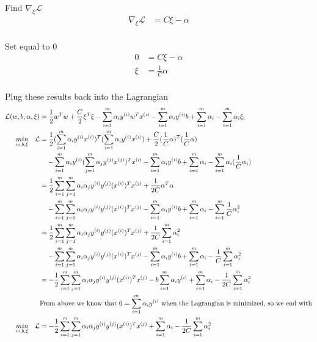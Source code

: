 \documentclass[11pt]{article}
\begin{document}
Find $\nabla_{\xi} \mathcal{L}$
\begin{align*}
  \nabla_{\xi} \mathcal{L} &= C \xi - \alpha \\
\end{align*}

Set equal to 0
\begin{align*}
  0   &= C \xi - \alpha \\
  \xi &= \frac{1}{C} \alpha \\
\end{align*}

Plug these results back into the Lagrangian
\begin{align*}
  \mathcal{L}(w,b,\alpha,\xi) &= \frac{1}{2} w^T w + \frac{C}{2} \xi^T \xi - \sum_{i=1}^{m} \alpha_i y^{(i)} w^T x^{(i)} - \sum_{i=1}^{m} \alpha_i y^{(i)} b + \sum_{i=1}^{m} \alpha_i - \sum_{i=1}^{m} \alpha_i \xi_i \\
  \underset{w,b,\xi}{min} \quad \mathcal{L} &= \frac{1}{2} (\sum_{i=1}^{m} \alpha_i y^{(i)} x^{(i)})^T (\sum_{i=1}^{m} \alpha_i y^{(i)} x^{(i)}) + \frac{C}{2} (\frac{1}{C} \alpha)^T (\frac{1}{C} \alpha) \\
                                            &\quad - \sum_{i=1}^{m} \alpha_i y^{(i)} (\sum_{j=1}^{m} \alpha_j y^{(j)} x^{(j)})^T x^{(i)} - \sum_{i=1}^{m} \alpha_i y^{(i)} b + \sum_{i=1}^{m} \alpha_i - \sum_{i=1}^{m} \alpha_i (\frac{1}{C} \alpha_i) \\
                                            &= \frac{1}{2} \sum_{i=1}^{m} \sum_{j=1}^{m} \alpha_i \alpha_j y^{(i)} y^{(j)} (x^{(i)})^T x^{(j)} + \frac{1}{2C} \alpha^T \alpha \\
                                            &\quad - \sum_{i=1}^{m} \sum_{j=1}^{m} \alpha_i \alpha_j y^{(i)} y^{(j)} (x^{(i)})^T x^{(j)} - \sum_{i=1}^{m} \alpha_i y^{(i)} b + \sum_{i=1}^{m} \alpha_i - \sum_{i=1}^{m} \frac{1}{C} \alpha_i^2 \\ 
                                            &= \frac{1}{2} \sum_{i=1}^{m} \sum_{j=1}^{m} \alpha_i \alpha_j y^{(i)} y^{(j)} (x^{(i)})^T x^{(j)} + \frac{1}{2C} \sum_{i=1}^{m} \alpha_i^2 \\
                                            &\quad - \sum_{i=1}^{m} \sum_{j=1}^{m} \alpha_i \alpha_j y^{(i)} y^{(j)} (x^{(i)})^T x^{(j)} - \sum_{i=1}^{m} \alpha_i y^{(i)} b + \sum_{i=1}^{m} \alpha_i - \frac{1}{C} \sum_{i=1}^{m} \alpha_i^2 \\ 
                                            &= -\frac{1}{2} \sum_{i=1}^{m} \sum_{j=1}^{m} \alpha_i \alpha_j y^{(i)} y^{(j)} (x^{(i)})^T x^{(j)} - b \sum_{i=1}^{m} \alpha_i y^{(i)} + \sum_{i=1}^{m} \alpha_i - \frac{1}{2C} \sum_{i=1}^{m} \alpha_i^2 \\
                                            &\text{From above we know that $0 = \sum_{i=1}^{m} \alpha_i y^{(i)}$ when the Lagrangian is minimized, so we end with} \\
  \underset{w,b,\xi}{min} \quad \mathcal{L} &= -\frac{1}{2} \sum_{i=1}^{m} \sum_{j=1}^{m} \alpha_i \alpha_j y^{(i)} y^{(j)} (x^{(i)})^T x^{(j)} + \sum_{i=1}^{m} \alpha_i - \frac{1}{2C} \sum_{i=1}^{m} \alpha_i^2 \\
\end{align*}
\end{document}
